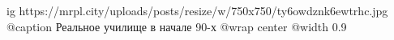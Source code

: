  
 
 
 
 

\ifcmt
  ig https://mrpl.city/uploads/posts/resize/w/750x750/ty6owdznk6ewtrhc.jpg
	@caption Реальное училище в начале 90-х
  @wrap center
  @width 0.9
\fi
